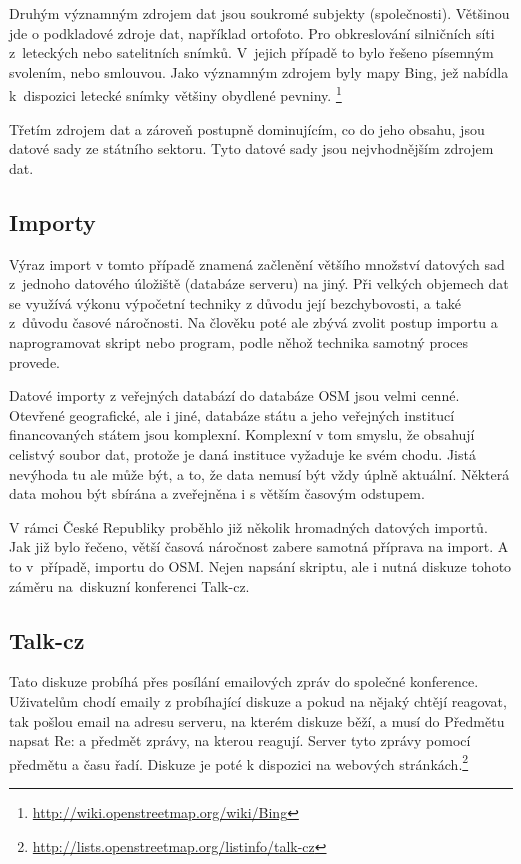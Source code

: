Druhým významným zdrojem dat jsou soukromé subjekty (společnosti).
Většinou jde o podkladové zdroje dat, například ortofoto. Pro obkreslování
silničních síti z~leteckých nebo satelitních snímků. V~jejich případě to
bylo řešeno písemným svolením, nebo smlouvou. Jako významným zdrojem byly
mapy Bing, jež nabídla k~dispozici letecké snímky většiny
obydlené pevniny. \footnote{\url{http://wiki.openstreetmap.org/wiki/Bing}}

Třetím zdrojem dat a zároveň postupně dominujícím, co do jeho obsahu, jsou
datové sady ze státního sektoru. Tyto datové sady jsou nejvhodnějším zdrojem
dat.

\subsection{Importy}
\label{Importy}
Výraz import v tomto případě znamená začlenění většího množství datových sad
z~jednoho datového úložiště (databáze serveru) na jiný. Při velkých objemech dat
se využívá výkonu výpočetní techniky z důvodu její bezchybovosti, a také
z~důvodu časové náročnosti. Na člověku poté ale zbývá zvolit postup importu
a naprogramovat skript nebo program, podle něhož technika samotný proces
provede. 

Datové importy z veřejných databází do databáze OSM jsou velmi cenné. 
Otevřené geografické, ale i jiné, databáze státu a jeho veřejných institucí 
financovaných státem jsou komplexní. Komplexní v tom smyslu, že obsahují celistvý
soubor dat, protože je daná instituce vyžaduje ke svém chodu. Jistá nevýhoda tu 
ale může být, a to, že data nemusí být vždy úplně aktuální. Některá data mohou 
být sbírána a zveřejněna i s větším časovým odstupem.

V rámci České Republiky proběhlo již několik hromadných datových importů. Jak 
již bylo řečeno, větší časová náročnost zabere samotná příprava na import. A to
v~případě, importu do OSM. Nejen napsání skriptu, ale i nutná diskuze tohoto záměru
na~diskuzní konferenci Talk-cz. 

\subsection{Talk-cz}
\label{Talk-cz}
Tato diskuze probíhá přes posílání emailových zpráv do společné konference. 
Uživatelům chodí emaily z probíhající diskuze a pokud na nějaký chtějí reagovat,
tak pošlou email na adresu serveru, na kterém diskuze běží, a musí do Předmětu 
napsat Re: a předmět zprávy, na kterou reagují. Server tyto zprávy pomocí 
předmětu a času řadí. Diskuze je poté k dispozici na webových stránkách.\footnote{\url{http://lists.openstreetmap.org/listinfo/talk-cz}}

